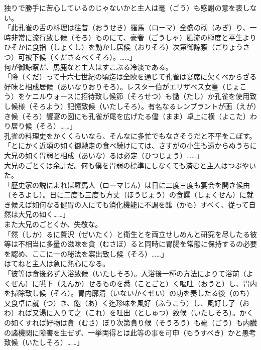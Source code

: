 \documentclass{book}
\begin{document}
独りで勝手に苦心しているのじゃないかと主人は毫（ごう）も感謝の意を表しない。\\

「此孔雀の舌の料理は往昔（おうせき）羅馬（ローマ）全盛の砌（みぎ）り、一時非常に流行致し候（そろ）ものにて、豪奢（ごうしゃ）風流の極度と平生よりひそかに食指（しょくし）を動かし居候（おりそろ）次第御諒察（ごりょうさつ）可被下候（くださるべくそろ）。\ldots{}\ldots{}」\\

何が御諒察だ、馬鹿なと主人はすこぶる冷淡である。\\

「降（くだ）って十六七世紀の頃迄は全欧を通じて孔雀は宴席に欠くべからざる好味と相成居候（あいなりおりそろ）。レスター伯がエリザベス女皇（じょこう）をケニルウォースに招待致し候節（そろせつ）も慥（たし）か孔雀を使用致し候様（そろよう）記憶致候（いたしそろ）。有名なるレンブラントが画（えが）き候（そろ）饗宴の図にも孔雀が尾を広げたる儘（まま）卓上に横（よこた）わり居り候（そろ）\ldots{}\ldots{}」\\

孔雀の料理史をかくくらいなら、そんなに多忙でもなさそうだと不平をこぼす。\\

「とにかく近頃の如く御馳走の食べ続けにては、さすがの小生も遠からぬうちに大兄の如く胃弱と相成（あいな）るは必定（ひつじょう）\ldots{}\ldots{}」\\

大兄のごとくは余計だ。何も僕を胃弱の標準にしなくても済むと主人はつぶやいた。\\

「歴史家の説によれば羅馬人（ローマじん）は日に二度三度も宴会を開き候由（そろよし）。日に二度も三度も方丈（ほうじょう）の食饌（しょくせん）に就き候えば如何なる健胃の人にても消化機能に不調を醸（かも）すべく、従って自然は大兄の如く\ldots{}\ldots{}」\\

また大兄のごとくか、失敬な。\\

「然（しか）るに贅沢（ぜいたく）と衛生とを両立せしめんと研究を尽したる彼等は不相当に多量の滋味を貪（むさぼ）ると同時に胃腸を常態に保持するの必要を認め、ここに一の秘法を案出致し候（そろ）\ldots{}\ldots{}」\\

はてねと主人は急に熱心になる。\\

「彼等は食後必ず入浴致候（いたしそろ）。入浴後一種の方法によりて浴前（よくぜん）に嚥下（えんか）せるものを悉（ことごと）く嘔吐（おうと）し、胃内を掃除致し候（そろ）。胃内廓清（いないかくせい）の功を奏したる後（のち）又食卓に就（つ）き、飽（あ）く迄珍味を風好（ふうこう）し、風好し了（おわ）れば又湯に入りて之（これ）を吐出（としゅつ）致候（いたしそろ）。かくの如くすれば好物は貪（むさ）ぼり次第貪り候（そうろう）も毫（ごう）も内臓の諸機関に障害を生ぜず、一挙両得とは此等の事を可申（もうすべき）かと愚考致候（いたしそろ）\ldots{}\ldots{}」\\
\end{document}
